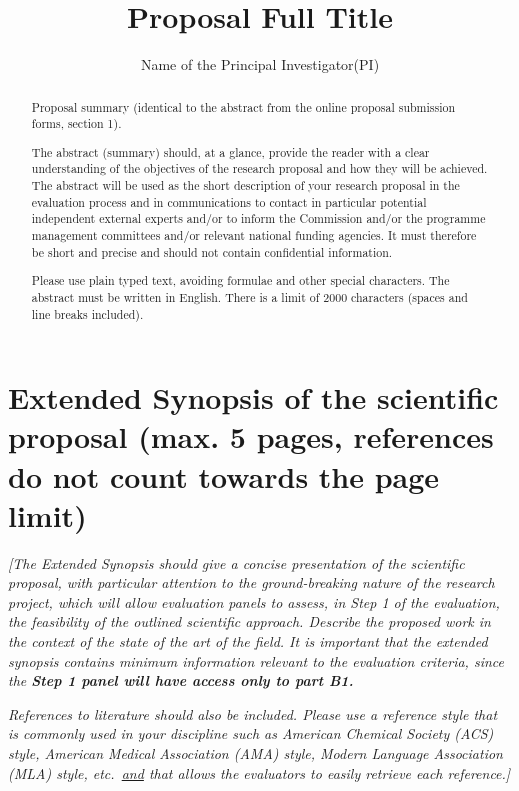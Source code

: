 \documentclass[b1]{erc} %
\title{Proposal Full Title}
\author[Applicant's last name]{Name of the Principal Investigator(PI)}
\begin{document}
\maketitle

\begin{abstract}
	Proposal summary (identical to the abstract from the online proposal submission forms, section 1). 

	The abstract (summary) should, at a glance, provide the reader with a clear understanding of the objectives of the research proposal and how they will be achieved. The abstract will be used as the short description of your research proposal in the evaluation process and in communications to contact in particular potential independent external experts and/or to inform the Commission and/or the programme management committees and/or relevant national funding agencies. It must therefore be short and precise and should not contain confidential information. 

	Please use plain typed text, avoiding formulae and other special characters. The abstract must be written in English. There is a limit of 2000 characters (spaces and line breaks included).
\end{abstract}

\section{Extended Synopsis of the scientific proposal (max. 5 pages, references do not count towards the page limit)}

\textit{[The Extended Synopsis should give a concise presentation of the scientific proposal, with particular attention to the ground-breaking nature of the research project, which will allow evaluation panels to assess, in Step 1 of the evaluation, the feasibility of the outlined scientific approach. Describe the proposed work in the context of the state of the art of the field. It is important that the extended synopsis contains minimum information relevant to the evaluation criteria, since the \textbf{Step 1 panel will have access only to part B1.}}

\textit{References to literature should also be included. Please use a reference style that is commonly used in your discipline such as American Chemical Society (ACS) style, American Medical Association (AMA) style, Modern Language Association (MLA) style, etc.\ \underline{and} that allows the evaluators to easily retrieve each reference.]}
\end{document}
